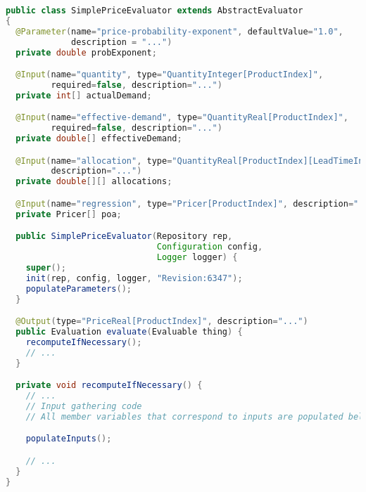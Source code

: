 \documentclass{article}
\begin{document}
{\small
\begin{lstlisting}[language={Java}]
public class SimplePriceEvaluator extends AbstractEvaluator
{
  @Parameter(name="price-probability-exponent", defaultValue="1.0",
             description = "...")
  private double probExponent;

  @Input(name="quantity", type="QuantityInteger[ProductIndex]",
         required=false, description="...")
  private int[] actualDemand;

  @Input(name="effective-demand", type="QuantityReal[ProductIndex]",
         required=false, description="...")
  private double[] effectiveDemand;

  @Input(name="allocation", type="QuantityReal[ProductIndex][LeadTimeInteger]",
         description="...")
  private double[][] allocations;

  @Input(name="regression", type="Pricer[ProductIndex]", description="...")
  private Pricer[] poa;

  public SimplePriceEvaluator(Repository rep,
                              Configuration config,
                              Logger logger) {
    super();
    init(rep, config, logger, "Revision:6347");
    populateParameters();
  }

  @Output(type="PriceReal[ProductIndex]", description="...")
  public Evaluation evaluate(Evaluable thing) {
    recomputeIfNecessary();
    // ...
  }

  private void recomputeIfNecessary() {
    // ...
    // Input gathering code
    // All member variables that correspond to inputs are populated below.

    populateInputs();

    // ...
  }
}
\end{lstlisting}
}



\end{document}
